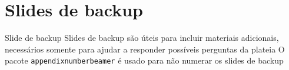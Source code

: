 \documentclass{beamer}
\begin{document}
\appendix

\section{Slides de backup}

\begin{frame}{Slide de backup}
    Slides de backup são úteis para incluir materiais adicionais, necessários somente para ajudar a responder possíveis perguntas da plateia
    \vfill
    O pacote \texttt{appendixnumberbeamer} é usado para não numerar os slides de backup
\end{frame}
\end{document}
